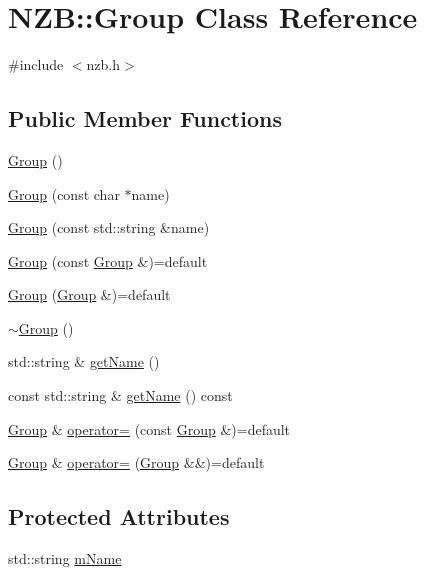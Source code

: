 \hypertarget{class_n_z_b_1_1_group}{}\section{N\+ZB\+:\+:Group Class Reference}
\label{class_n_z_b_1_1_group}


{\ttfamily \#include $<$nzb.\+h$>$}

\subsection*{Public Member Functions}
\begin{DoxyCompactItemize}
\item 
\hyperlink{class_n_z_b_1_1_group_ab799deb858fbbbdf6cdfb8bb1814b015}{Group} ()
\item 
\hyperlink{class_n_z_b_1_1_group_a59f8f83b74d872880d0582ad56bcce64}{Group} (const char $\ast$name)
\item 
\hyperlink{class_n_z_b_1_1_group_a929441831526bd1bd7b8e5dac6794fac}{Group} (const std\+::string \&name)
\item 
\hyperlink{class_n_z_b_1_1_group_ae3ddea478bd7b8fbd1ac423ed7cf6983}{Group} (const \hyperlink{class_n_z_b_1_1_group}{Group} \&)=default
\item 
\hyperlink{class_n_z_b_1_1_group_ad2500958fd2e17c916b0f00eeb5ef0bc}{Group} (\hyperlink{class_n_z_b_1_1_group}{Group} \&)=default
\item 
\hyperlink{class_n_z_b_1_1_group_afb70483ef9e9576fd7d3f6623c54a346}{$\sim$\+Group} ()
\item 
std\+::string \& \hyperlink{class_n_z_b_1_1_group_a362fd5943887fb40d051d45f7f96bc2b}{get\+Name} ()
\item 
const std\+::string \& \hyperlink{class_n_z_b_1_1_group_aad7e7bfaf13affed32b1bb01df19ef01}{get\+Name} () const
\item 
\hyperlink{class_n_z_b_1_1_group}{Group} \& \hyperlink{class_n_z_b_1_1_group_a38caf694b0702f968d220c1dd7105fb3}{operator=} (const \hyperlink{class_n_z_b_1_1_group}{Group} \&)=default
\item 
\hyperlink{class_n_z_b_1_1_group}{Group} \& \hyperlink{class_n_z_b_1_1_group_a2b8221d52e4824ca8105a9d3488a5002}{operator=} (\hyperlink{class_n_z_b_1_1_group}{Group} \&\&)=default
\end{DoxyCompactItemize}
\subsection*{Protected Attributes}
\begin{DoxyCompactItemize}
\item 
std\+::string \hyperlink{class_n_z_b_1_1_group_af721887690a5fef15739523486f36a59}{m\+Name}
\end{DoxyCompactItemize}


